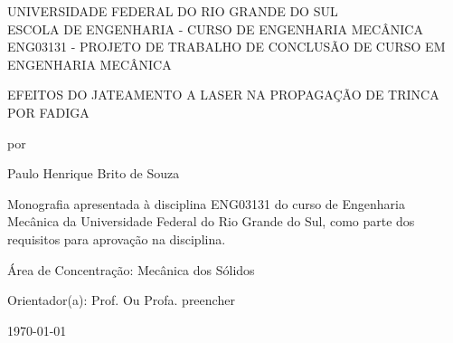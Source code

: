 \begin{center}

{\MakeUppercase{
    UNIVERSIDADE FEDERAL DO RIO GRANDE DO SUL \\
    ESCOLA DE ENGENHARIA - CURSO DE ENGENHARIA MECÂNICA \\
    ENG03131 - PROJETO DE TRABALHO DE CONCLUSÃO DE CURSO EM \\
    ENGENHARIA MECÂNICA 
    }}

\vspace{5\baselineskip}
{\MakeUppercase{
    Efeitos do jateamento a laser na propagação de trinca por fadiga 
}}

\vspace{1\baselineskip}
{por}

\vspace{2\baselineskip}
{Paulo Henrique Brito de Souza}
\end{center}

\vspace{5\baselineskip}
\begin{flushright}
    \parbox{0.5\linewidth}{
				\justifying
				\parindent=0pt
				Monografia apresentada à disciplina ENG03131 do curso de Engenharia \\
                Mecânica da Universidade Federal do Rio Grande do Sul, como parte dos requisitos para aprovação na disciplina.
                }
\end{flushright}

\vspace{1\baselineskip}
\begin{flushright}
    \parbox{0.5\linewidth}{
				\justifying
				\parindent=0pt
				Área de Concentração: Mecânica dos Sólidos
                }
\end{flushright}

\vspace{1\baselineskip}
\begin{flushright}
    \parbox{0.5\linewidth}{
				\justifying
				\parindent=0pt
				Orientador(a): Prof. Ou Profa.  preencher
                }
\end{flushright}

\begin{center}
    \vfill{\today}
\end{center}

